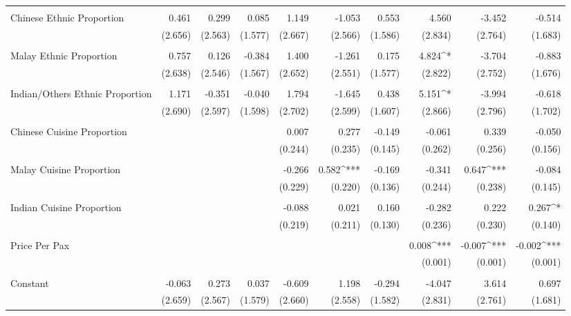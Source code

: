 \begin{table}[!htbp]
\begin{tabular}{@{\extracolsep{5pt}}lD{.}{.}{-3} D{.}{.}{-3} D{.}{.}{-3} D{.}{.}{-3} D{.}{.}{-3} D{.}{.}{-3} D{.}{.}{-3} D{.}{.}{-3} D{.}{.}{-3} }
  & & & & & & & & & \\ 
 Chinese Ethnic Proportion & 0.461 & 0.299 & 0.085 & 1.149 & -1.053 & 0.553 & 4.560 & -3.452 & -0.514 \\ 
  & (2.656) & (2.563) & (1.577) & (2.667) & (2.566) & (1.586) & (2.834) & (2.764) & (1.683) \\ 
  & & & & & & & & & \\ 
 Malay Ethnic Proportion & 0.757 & 0.126 & -0.384 & 1.400 & -1.261 & 0.175 & 4.824^{*} & -3.704 & -0.883 \\ 
  & (2.638) & (2.546) & (1.567) & (2.652) & (2.551) & (1.577) & (2.822) & (2.752) & (1.676) \\ 
  & & & & & & & & & \\ 
 Indian/Others Ethnic Proportion & 1.171 & -0.351 & -0.040 & 1.794 & -1.645 & 0.438 & 5.151^{*} & -3.994 & -0.618 \\ 
  & (2.690) & (2.597) & (1.598) & (2.702) & (2.599) & (1.607) & (2.866) & (2.796) & (1.702) \\ 
  & & & & & & & & & \\ 
 Chinese Cuisine Proportion &  &  &  & 0.007 & 0.277 & -0.149 & -0.061 & 0.339 & -0.050 \\ 
  &  &  &  & (0.244) & (0.235) & (0.145) & (0.262) & (0.256) & (0.156) \\ 
  & & & & & & & & & \\ 
 Malay Cuisine Proportion &  &  &  & -0.266 & 0.582^{***} & -0.169 & -0.341 & 0.647^{***} & -0.084 \\ 
  &  &  &  & (0.229) & (0.220) & (0.136) & (0.244) & (0.238) & (0.145) \\ 
  & & & & & & & & & \\ 
 Indian Cuisine Proportion &  &  &  & -0.088 & 0.021 & 0.160 & -0.282 & 0.222 & 0.267^{*} \\ 
  &  &  &  & (0.219) & (0.211) & (0.130) & (0.236) & (0.230) & (0.140) \\ 
  & & & & & & & & & \\ 
 Price Per Pax &  &  &  &  &  &  & 0.008^{***} & -0.007^{***} & -0.002^{***} \\ 
  &  &  &  &  &  &  & (0.001) & (0.001) & (0.001) \\ 
  & & & & & & & & & \\ 
 Constant & -0.063 & 0.273 & 0.037 & -0.609 & 1.198 & -0.294 & -4.047 & 3.614 & 0.697 \\ 
  & (2.659) & (2.567) & (1.579) & (2.660) & (2.558) & (1.582) & (2.831) & (2.761) & (1.681) \\ 

\end{tabular}
\end{table}
